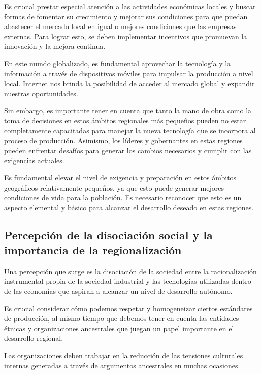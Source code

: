 \documentclass[
  letterpaper,
  DIV=11,
  numbers=noendperiod]{scrartcl}
\begin{document}
Es crucial prestar especial atención a las actividades económicas
locales y buscar formas de fomentar su crecimiento y mejorar sus
condiciones para que puedan abastecer el mercado local en igual o
mejores condiciones que las empresas externas. Para lograr esto, se
deben implementar incentivos que promuevan la innovación y la mejora
continua.

En este mundo globalizado, es fundamental aprovechar la tecnología y la
información a través de dispositivos móviles para impulsar la producción
a nivel local. Internet nos brinda la posibilidad de acceder al mercado
global y expandir nuestras oportunidades.

Sin embargo, es importante tener en cuenta que tanto la mano de obra
como la toma de decisiones en estos ámbitos regionales más pequeños
pueden no estar completamente capacitadas para manejar la nueva
tecnología que se incorpora al proceso de producción. Asimismo, los
líderes y gobernantes en estas regiones pueden enfrentar desafíos para
generar los cambios necesarios y cumplir con las exigencias actuales.

Es fundamental elevar el nivel de exigencia y preparación en estos
ámbitos geográficos relativamente pequeños, ya que esto puede generar
mejores condiciones de vida para la población. Es necesario reconocer
que esto es un aspecto elemental y básico para alcanzar el desarrollo
deseado en estas regiones.

\hypertarget{percepciuxf3n-de-la-disociaciuxf3n-social-y-la-importancia-de-la-regionalizaciuxf3n}{%
\subsection{Percepción de la disociación social y la importancia de la
regionalización}\label{percepciuxf3n-de-la-disociaciuxf3n-social-y-la-importancia-de-la-regionalizaciuxf3n}}

Una percepción que surge es la disociación de la sociedad entre la
racionalización instrumental propia de la sociedad industrial y las
tecnologías utilizadas dentro de las economías que aspiran a alcanzar un
nivel de desarrollo autónomo.

Es crucial considerar cómo podemos respetar y homogeneizar ciertos
estándares de producción, al mismo tiempo que debemos tener en cuenta
las entidades étnicas y organizaciones ancestrales que juegan un papel
importante en el desarrollo regional.

Las organizaciones deben trabajar en la reducción de las tensiones
culturales internas generadas a través de argumentos ancestrales en
muchas ocasiones.
\end{document}
